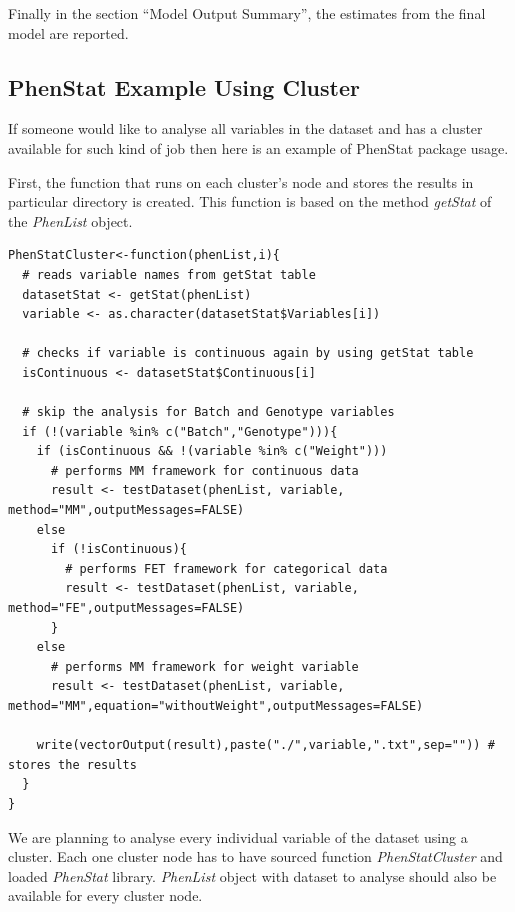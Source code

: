 \documentclass[12pt,a4paper]{article}
\begin{document}
Finally in the section “Model Output Summary”, the estimates from the final model are reported. 

\subsection{PhenStat Example Using Cluster}
If someone would like to analyse all variables in the dataset and has a cluster available for such kind of job then here is an example of PhenStat package usage.

First, the function that runs on each cluster's node and stores the results in particular directory is created. This function is based on the method \textit{getStat} of the \textit{PhenList} object. 


\begingroup
\fontsize{8pt}{12pt}\selectfont
\begin{verbatim}
PhenStatCluster<-function(phenList,i){
  # reads variable names from getStat table
  datasetStat <- getStat(phenList)
  variable <- as.character(datasetStat$Variables[i]) 
  
  # checks if variable is continuous again by using getStat table
  isContinuous <- datasetStat$Continuous[i]  
  
  # skip the analysis for Batch and Genotype variables
  if (!(variable %in% c("Batch","Genotype"))){	
    if (isContinuous && !(variable %in% c("Weight"))) 
      # performs MM framework for continuous data
      result <- testDataset(phenList, variable, method="MM",outputMessages=FALSE)	 
    else
      if (!isContinuous){
        # performs FET framework for categorical data
        result <- testDataset(phenList, variable, method="FE",outputMessages=FALSE)	
      }
    else
      # performs MM framework for weight variable
      result <- testDataset(phenList, variable, method="MM",equation="withoutWeight",outputMessages=FALSE) 
    
    write(vectorOutput(result),paste("./",variable,".txt",sep="")) # stores the results
  }
}
\end{verbatim}
\endgroup

We are planning to analyse every individual variable of the dataset using a cluster. Each one cluster node has to have sourced function \textit{PhenStatCluster} and loaded \textit{PhenStat} library. 
\textit{PhenList} object with dataset to analyse should also be available for every cluster node.
\end{document}
